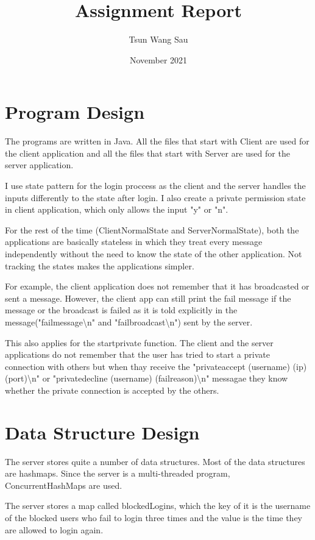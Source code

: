\documentclass[10pt]{article}
\title{Assignment Report}
\author{Tsun Wang Sau}
\date{November 2021}
\begin{document}
\maketitle
\section*{Program Design}

The programs are written in Java. All the files that start with Client are used for the client application and all the files that start with Server are used for the server application.


I use state pattern for the login proccess as the client and the server handles the inputs differently to the state after login. I also create a private permission state in client application, which only allows the input "y" or "n".


For the rest of the time (ClientNormalState and ServerNormalState), both the applications are basically stateless in which they treat every message independently without the need to know the state of the other application. Not tracking the states makes the applications simpler.

For example, the client application does not remember that it has broadcasted or sent a message. However, the client app can still print the fail message if the message or the broadcast is failed as it is told explicitly in the message("failmessage\textbackslash n" and "failbroadcast\textbackslash n") sent by the server. 

This also applies for the startprivate function. The client and the server applications do not remember that the user has tried to start a private connection with others but when thay receive the "privateaccept (username) (ip) (port)\textbackslash n" or "privatedecline (username) (failreason)\textbackslash n" messagae they know whether the private connection is accepted by the others.


\section*{Data Structure Design}
The server stores quite a number of data structures. Most of the data structures are hashmaps. Since the server is a multi-threaded program, ConcurrentHashMaps are used.

The server stores a map called blockedLogins, which the key of it is the username of the blocked users who fail to login three times and the value is the time they are allowed to login again.
\end{document}
